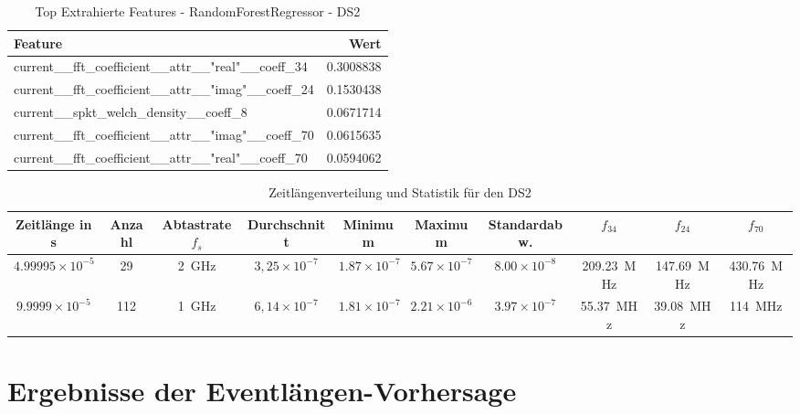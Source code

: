 \begin{table}[h!]
\centering
\caption{Top Extrahierte Features - RandomForestRegressor - DS2}
\label{tab:ds2-features}
\begin{tabular}{l r}
\hline
\textbf{Feature} & \textbf{Wert} \\
\hline
current\_\_fft\_coefficient\_\_attr\_\_"real"\_\_coeff\_34 & 0.3008838 \\
current\_\_fft\_coefficient\_\_attr\_\_"imag"\_\_coeff\_24 & 0.1530438 \\
current\_\_spkt\_welch\_density\_\_coeff\_8 & 0.0671714 \\
current\_\_fft\_coefficient\_\_attr\_\_"imag"\_\_coeff\_70 & 0.0615635 \\
current\_\_fft\_coefficient\_\_attr\_\_"real"\_\_coeff\_70 & 0.0594062 \\
\hline
\end{tabular}
\end{table}


\begin{table}[h!]
\centering
\begin{tabular}{|c|c|c|c|c|c|c|c|c|c|}
\hline
\textbf{Zeitlänge in s} & \textbf{Anzahl} & \textbf{Abtastrate} $f_s$ & \textbf{Durchschnitt} & \textbf{Minimum} & \textbf{Maximum} & \textbf{Standardabw.} & \(f_{34}\) & \(f_{24}\) & \(f_{70}\)\\
\hline
$4.99995 \times 10^{-5}$ & 29  & \SI{2}{\giga\hertz} & $3,25 \times 10^{-7}$ & $1.87 \times 10^{-7}$ & $5.67 \times 10^{-7}$ & $8.00 \times 10^{-8}$ & \SI{209,23}{\mega\hertz} & \SI{147,69}{\mega\hertz} & \SI{430,76}{\mega\hertz}\\
$9.9999 \times 10^{-5}$  & 112 & \SI{1}{\giga\hertz} & $6,14 \times 10^{-7}$ & $1.81 \times 10^{-7}$ & $2.21 \times 10^{-6}$ & $3.97 \times 10^{-7}$ & \SI{55,37}{\mega\hertz} & \SI{39,08}{\mega\hertz} & \SI{114}{\mega\hertz}\\
\hline
\end{tabular}
\caption{Zeitlängenverteilung und Statistik für den DS2}
\label{tab:ds2-sample}
\end{table}




\section{Ergebnisse der Eventlängen-Vorhersage}

